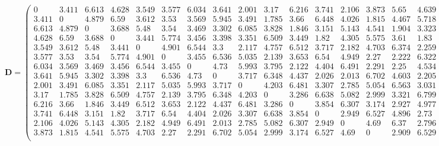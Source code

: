 \documentclass[11pt,oneside,czech,american]{book} %
\theoremstyle{plain}
\theoremstyle{definition}
\begin{document}
\tiny
$$\bm{D}=\begin{pmatrix}
	0 & 3.411 & 6.613 & 4.628 & 3.549 & 3.577 & 6.034 & 3.641 & 2.001 & 3.17 & 6.216 & 3.741 & 2.106 & 3.873 & 5.65 & 4.639 & 3.327 & 2.033 & 5.169 & 5.541\\
	3.411 & 0 & 4.879 & 6.59 & 3.612 & 3.53 & 3.569 & 5.945 & 3.491 & 1.785 & 3.66 & 6.448 & 4.026 & 1.815 & 4.467 & 5.718 & 1.852 & 3.422 & 5.694 & 5.51\\
	6.613 & 4.879 & 0 & 3.688 & 5.48 & 3.54 & 3.469 & 3.302 & 6.085 & 3.828 & 1.846 & 3.151 & 5.143 & 4.541 & 1.904 & 3.323 & 5.456 & 5.653 & 3.653 & 1.867\\
	4.628 & 6.59 & 3.688 & 0 & 3.441 & 5.774 & 3.456 & 3.398 & 3.351 & 6.509 & 3.449 & 1.82 & 4.305 & 5.575 & 3.61 & 1.83 & 5.5 & 5.548 & 1.834 & 3.578\\
	3.549 & 3.612 & 5.48 & 3.441 & 0 & 4.901 & 6.544 & 3.3 & 2.117 & 4.757 & 6.512 & 3.717 & 2.182 & 4.703 & 6.374 & 2.259 & 2.334 & 3.094 & 4.528 & 4.838\\
	3.577 & 3.53 & 3.54 & 5.774 & 4.901 & 0 & 3.455 & 6.536 & 5.035 & 2.139 & 3.653 & 6.54 & 4.949 & 2.27 & 2.222 & 6.322 & 3.527 & 2.149 & 5.203 & 4.682\\
	6.034 & 3.569 & 3.469 & 3.456 & 6.544 & 3.455 & 0 & 4.73 & 5.993 & 3.795 & 2.122 & 4.404 & 6.491 & 2.291 & 2.25 & 4.534 & 4.717 & 5.091 & 2.188 & 3.5\\
	3.641 & 5.945 & 3.302 & 3.398 & 3.3 & 6.536 & 4.73 & 0 & 3.717 & 6.348 & 4.437 & 2.026 & 2.013 & 6.702 & 4.603 & 2.205 & 5.349 & 4.735 & 3.328 & 1.958\\
	2.001 & 3.491 & 6.085 & 3.351 & 2.117 & 5.035 & 5.993 & 3.717 & 0 & 4.203 & 6.481 & 3.307 & 2.785 & 5.054 & 6.563 & 3.031 & 3.088 & 3.565 & 3.805 & 5.021\\
	3.17 & 1.785 & 3.828 & 6.509 & 4.757 & 2.139 & 3.795 & 6.348 & 4.203 & 0 & 3.286 & 6.638 & 5.082 & 2.999 & 3.321 & 6.799 & 2.841 & 3.047 & 5.555 & 4.406\\
	6.216 & 3.66 & 1.846 & 3.449 & 6.512 & 3.653 & 2.122 & 4.437 & 6.481 & 3.286 & 0 & 3.854 & 6.307 & 3.174 & 2.927 & 4.977 & 4.191 & 5.364 & 3.14 & 3.006\\
	3.741 & 6.448 & 3.151 & 1.82 & 3.717 & 6.54 & 4.404 & 2.026 & 3.307 & 6.638 & 3.854 & 0 & 2.949 & 6.527 & 4.896 & 2.73 & 5.45 & 4.431 & 2.824 & 2.889\\
	2.106 & 4.026 & 5.143 & 4.305 & 2.182 & 4.949 & 6.491 & 2.013 & 2.785 & 5.082 & 6.307 & 2.949 & 0 & 4.69 & 6.37 & 2.796 & 3.621 & 3.031 & 4.611 & 3.952\\
	3.873 & 1.815 & 4.541 & 5.575 & 4.703 & 2.27 & 2.291 & 6.702 & 5.054 & 2.999 & 3.174 & 6.527 & 4.69 & 0 & 2.909 & 6.529 & 2.945 & 3.094 & 4.466 & 4.918\\

\end{pmatrix}$$
\end{document}
